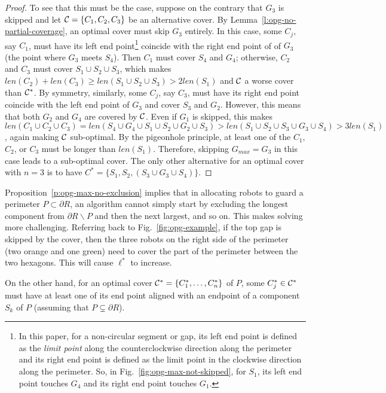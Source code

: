 \begin{proof}
To see that this must be the case, suppose on the contrary that $G_3$ 
is skipped and let $\mathcal C = \{C_1, C_2, C_3\}$ be an alternative cover. 
By Lemma~\ref{l:opg-no-partial-coverage}, an optimal cover must skip $G_3$ 
entirely. In this case, some $C_j$, say $C_1$, must have its left end 
point\footnote{In this paper, for a non-circular segment or gap, its 
left end point is defined as the {\em limit point} along the 
counterclockwise direction along the perimeter and its right end point 
is defined as the limit point in the clockwise direction along the 
perimeter. So, in Fig.~\ref{fig:opg-max-not-skipped}, for $S_1$, its left 
end point touches $G_4$ and its right end point touches $G_1$.} coincide 
with the right end point of of $G_3$ (the point where $G_3$ meets $S_4$). 
Then $C_1$ must cover $S_4$ and $G_4$; otherwise, $C_2$ and $C_3$ must 
cover $S_1 \cup S_2 \cup S_3$, which makes $len(C_2) + len(C_3) \ge 
len(S_1 \cup S_2 \cup S_3) > 2len(S_1)$ and $\mathcal C$ a worse cover than 
$\mathcal C^*$. By symmetry, similarly, some $C_j$, say $C_3$, must have its 
right end point coincide with the left end point of $G_3$ and cover 
$S_3$ and $G_2$. However, this means that both $G_2$ and $G_4$ are 
covered by $\mathcal C$. Even if $G_1$ is skipped, this makes $len(C_1 \cup 
C_2 \cup C_3) = len(S_4 \cup G_4 \cup S_1 \cup S_2 \cup G_2 \cup S_3) 
> len (S_1 \cup S_2 \cup S_3\cup G_3\cup S_4) > 3len(S_1)$, again making
$\mathcal C$ sub-optimal. By the pigeonhole principle, at least one of the $C_1$, 
$C_2$, or $C_3$ must be longer than $len(S_1)$. Therefore, skipping 
$G_{max} = G_3$ in this case leads to a sub-optimal cover. The only 
other alternative for an optimal cover with $n = 3$ is to have $C^* = 
\{S_1, S_2, (S_3\cup G_3\cup S_4)\}$. 
\end{proof}

Proposition~\ref{p:opg-max-no-exclusion} implies that in allocating robots 
to guard a perimeter $P \subset \partial R$, an algorithm cannot simply 
start by excluding the longest component from $\partial R 
\backslash P$ and then the next largest, and so on. This makes solving
\opg more challenging. Referring back to Fig.~\ref{fig:opg-example}, if the 
top gap is skipped by the cover, then the three robots on the right side 
of the perimeter (two orange and one green) need to cover the part of the 
perimeter between the two hexagons. This will cause $\ell^*$ to increase. 

On the other hand, for an optimal cover $\mathcal C^* = \{C_1^*, \ldots, C_n^*\}$ 
of $P$, some $C_j^*\in \mathcal C^*$ must have at least one of its end point 
aligned with an endpoint of a component $S_k$ of $P$ (assuming that $P 
\subsetneq \partial R$). 

